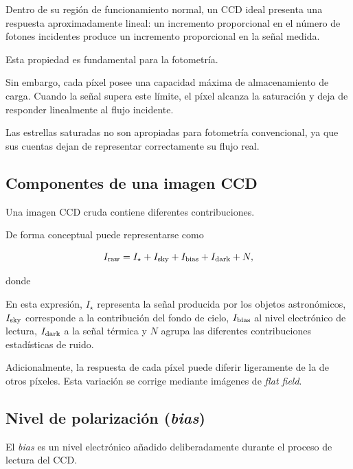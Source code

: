 \documentclass[12pt,letterpaper,oneside]{book}
\begin{document}
Dentro de su región de funcionamiento normal, un CCD ideal presenta una respuesta aproximadamente lineal: un incremento proporcional en el número de fotones incidentes produce un incremento proporcional en la señal medida.

Esta propiedad es fundamental para la fotometría.

Sin embargo, cada píxel posee una capacidad máxima de almacenamiento de carga. Cuando la señal supera este límite, el píxel alcanza la saturación y deja de responder linealmente al flujo incidente.

Las estrellas saturadas no son apropiadas para fotometría convencional, ya que sus cuentas dejan de representar correctamente su flujo real.



\subsection{Componentes de una imagen CCD}

Una imagen CCD cruda contiene diferentes contribuciones.

De forma conceptual puede representarse como

\[
I_{\rm raw}
=
I_{\star}
+
I_{\rm sky}
+
I_{\rm bias}
+
I_{\rm dark}
+
N,
\]

donde

En esta expresión, $I_{\star}$ representa la señal producida por los objetos astronómicos, $I_{\rm sky}$ corresponde a la contribución del fondo de cielo, $I_{\rm bias}$ al nivel electrónico de lectura, $I_{\rm dark}$ a la señal térmica y $N$ agrupa las diferentes contribuciones estadísticas de ruido.

Adicionalmente, la respuesta de cada píxel puede diferir ligeramente de la de otros píxeles. Esta variación se corrige mediante imágenes de \textit{flat field}.



\subsection{Nivel de polarización (\textit{bias})}

El \textit{bias} es un nivel electrónico añadido deliberadamente durante el proceso de lectura del CCD.
\end{document}
